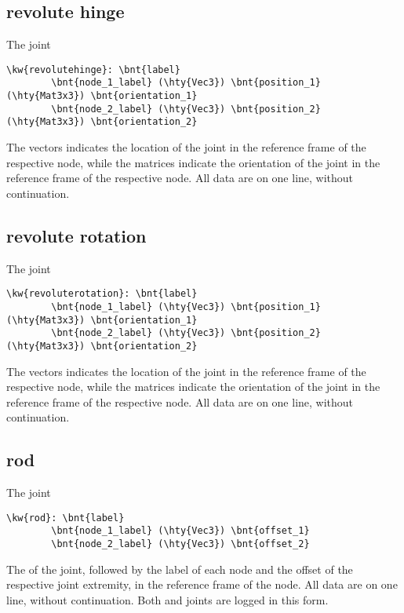 \subsection{revolute hinge}
The  joint
\begin{Verbatim}[commandchars=\\\{\}]
    \kw{revolutehinge}: \bnt{label}
        \bnt{node_1_label} (\hty{Vec3}) \bnt{position_1} (\hty{Mat3x3}) \bnt{orientation_1}
        \bnt{node_2_label} (\hty{Vec3}) \bnt{position_2} (\hty{Mat3x3}) \bnt{orientation_2}
\end{Verbatim}
The  vectors indicates the location of the joint
in the reference frame of the respective node,
while the  matrices indicate the orientation of the joint
in the reference frame of the respective node.
All data are on one line, without continuation.

\subsection{revolute rotation}
The  joint
\begin{Verbatim}[commandchars=\\\{\}]
    \kw{revoluterotation}: \bnt{label}
        \bnt{node_1_label} (\hty{Vec3}) \bnt{position_1} (\hty{Mat3x3}) \bnt{orientation_1}
        \bnt{node_2_label} (\hty{Vec3}) \bnt{position_2} (\hty{Mat3x3}) \bnt{orientation_2}
\end{Verbatim}
The  vectors indicates the location of the joint
in the reference frame of the respective node,
while the  matrices indicate the orientation of the joint
in the reference frame of the respective node.
All data are on one line, without continuation.

\subsection{rod}
The  joint
\begin{Verbatim}[commandchars=\\\{\}]
    \kw{rod}: \bnt{label}
        \bnt{node_1_label} (\hty{Vec3}) \bnt{offset_1}
        \bnt{node_2_label} (\hty{Vec3}) \bnt{offset_2}
\end{Verbatim}
The  of the joint, followed by the label of each node
and the offset of the respective joint extremity,
in the reference frame of the node.
All data are on one line, without continuation.
Both  and  joints are logged
in this form.

